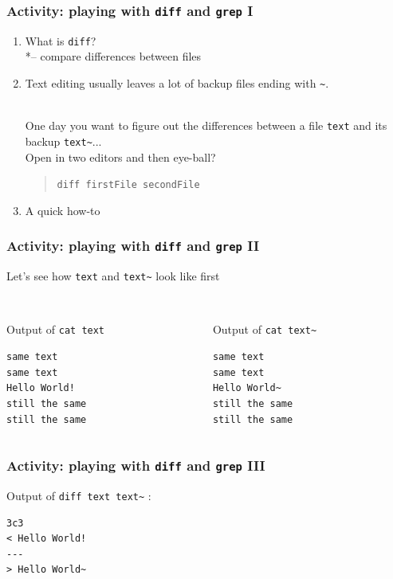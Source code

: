 \documentclass[a4paper]{beamer}
\newcommand{\cmd}[1]{\begin{quote}{\tt #1}\end{quote}}
\begin{document}
\begin{frame}
\frametitle{Activity: playing with \texttt{diff} and \texttt{grep} I}
\begin{enumerate}
\item What is \texttt{diff}?
\\*-- compare differences between files


\item Text editing usually leaves a lot of backup files ending with \texttt{\~}.

\\  One day you want to figure out the differences between a file \texttt{text} and its backup \texttt{text\~}...
\\  Open in two editors and then eye-ball?

\cmd{diff firstFile secondFile}

\item A quick how-to


\end{enumerate}
\end{frame}



\begin{frame}[fragile]
\frametitle{Activity: playing with \texttt{diff} and \texttt{grep} II}
Let's see how \texttt{text} and \texttt{text\~} look like first

\begin{columns}
\begin{column}{0.5\textwidth}
\\ Output of \texttt{cat text}

\begin{verbatim}
same text
same text
Hello World!
still the same
still the same
\end{verbatim}
\end{column}

\begin{column}{0.5\textwidth}
\\ Output of \texttt{cat text\~}
\begin{verbatim}
same text
same text
Hello World~
still the same
still the same
\end{verbatim}
\end{column}
\end{columns}
\end{frame}


\begin{frame}[fragile]
\frametitle{Activity: playing with \texttt{diff} and \texttt{grep} III}
Output of \texttt{diff text text\~} :
\begin{verbatim}
3c3
< Hello World!
---
> Hello World~
\end{verbatim}
\end{frame}
\end{document}
